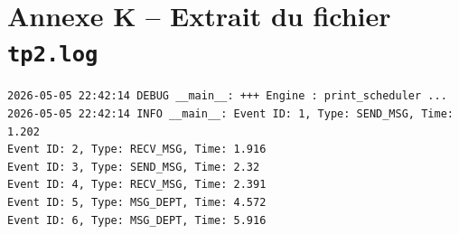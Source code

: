 \documentclass{article}
\begin{document}
\section{Annexe K -- Extrait du fichier \texttt{tp2.log}}

\begin{lstlisting}[caption=tp2.log]
2026-05-05 22:42:14 DEBUG __main__: +++ Engine : print_scheduler ...
2026-05-05 22:42:14 INFO __main__: Event ID: 1, Type: SEND_MSG, Time: 1.202
Event ID: 2, Type: RECV_MSG, Time: 1.916
Event ID: 3, Type: SEND_MSG, Time: 2.32
Event ID: 4, Type: RECV_MSG, Time: 2.391
Event ID: 5, Type: MSG_DEPT, Time: 4.572
Event ID: 6, Type: MSG_DEPT, Time: 5.916
\end{lstlisting}
\end{document}
